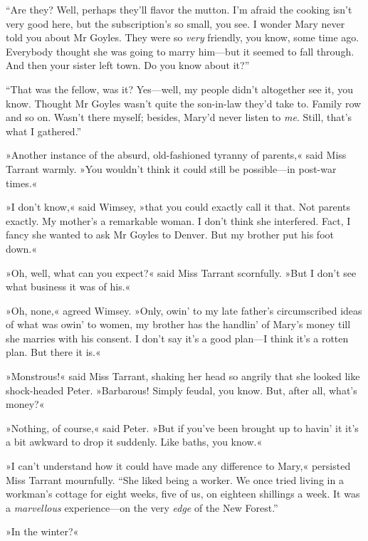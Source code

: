 \enquote{Are they? Well, perhaps they'll flavor the mutton. I'm afraid the cooking isn't very good here, but the subscription's so small, you see.  I wonder Mary never told you about Mr Goyles. They were so \textit{very} friendly, you know, some time ago. Everybody thought she was going to marry him\allowbreak---\allowbreak but it seemed to fall through. And then your sister left town. Do you know about it?}

\enquote{That was the fellow, was it? Yes\allowbreak---\allowbreak well, my people didn't altogether see it, you know. Thought Mr Goyles wasn't quite the son-in-law they'd take to. Family row and so on. Wasn't there myself; besides, Mary'd never listen to \textit{me}. Still, that's what I gathered.}

»Another instance of the absurd, old-fashioned tyranny of parents,« said Miss Tarrant warmly. »You wouldn't think it could still be possible\allowbreak---\allowbreak in post-war times.«

»I don't know,« said Wimsey, »that you could exactly call it that. Not parents exactly. My mother's a remarkable woman. I don't think she interfered. Fact, I fancy she wanted to ask Mr Goyles to Denver. But my brother put his foot down.«

»Oh, well, what can you expect?« said Miss Tarrant scornfully. »But I don't see what business it was of his.«

»Oh, none,« agreed Wimsey. »Only, owin' to my late father's circumscribed ideas of what was owin' to women, my brother has the handlin' of Mary's money till she marries with his consent. I don't say it's a good plan\allowbreak---\allowbreak I think it's a rotten plan. But there it is.«

»Monstrous!« said Miss Tarrant, shaking her head so angrily that she looked like shock-headed Peter. »Barbarous! Simply feudal, you know.  But, after all, what's money?«

»Nothing, of course,« said Peter. »But if you've been brought up to havin' it it's a bit awkward to drop it suddenly. Like baths, you know.«

»I can't understand how it could have made any difference to Mary,« persisted Miss Tarrant mournfully. \enquote{She liked being a worker. We once tried living in a workman's cottage for eight weeks, five of us, on eighteen shillings a week. It was a \textit{marvellous} experience\allowbreak---\allowbreak on the very \textit{edge} of the New Forest.}

»In the winter?«

